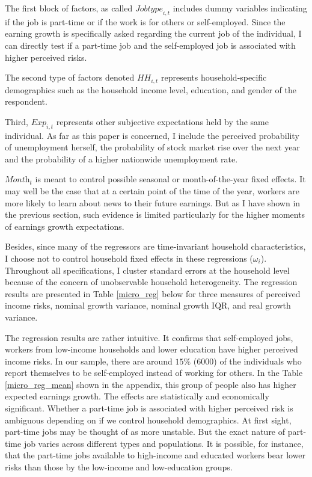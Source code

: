 \documentclass[12pt,notitlepage,onecolumn,aps,pra]{article}
\begin{document}
The first block of factors, as called \(\textit{Jobtype}_{i,t}\)
includes dummy variables indicating if the job is part-time or if the
work is for others or self-employed. Since the earning growth is
specifically asked regarding the current job of the individual, I can
directly test if a part-time job and the self-employed job is associated
with higher perceived risks.

The second type of factors denoted \(\textit{HH}_{i,t}\) represents
household-specific demographics such as the household income level,
education, and gender of the respondent.

Third, \(\textit{Exp}_{i,t}\) represents other subjective expectations
held by the same individual. As far as this paper is concerned, I
include the perceived probability of unemployment herself, the
probability of stock market rise over the next year and the probability
of a higher nationwide unemployment rate.

\(\textit{Month}_t\) is meant to control possible seasonal or
month-of-the-year fixed effects. It may well be the case that at a
certain point of the time of the year, workers are more likely to learn
about news to their future earnings. But as I have shown in the previous
section, such evidence is limited particularly for the higher moments of
earnings growth expectations.

Besides, since many of the regressors are time-invariant household
characteristics, I choose not to control household fixed effects in
these regressions (\(\omega_i\)). Throughout all specifications, I
cluster standard errors at the household level because of the concern of
unobservable household heterogeneity. The regression results are
presented in Table \ref{micro_reg} below for three measures of perceived
income risks, nominal growth variance, nominal growth IQR, and real
growth variance.

The regression results are rather intuitive. It confirms that
self-employed jobs, workers from low-income households and lower
education have higher perceived income risks. In our sample, there are
around \(15\%\) (6000) of the individuals who report themselves to be
self-employed instead of working for others. In the Table
\ref{micro_reg_mean} shown in the appendix, this group of people also
has higher expected earnings growth. The effects are statistically and
economically significant. Whether a part-time job is associated with
higher perceived risk is ambiguous depending on if we control household
demographics. At first sight, part-time jobs may be thought of as more
unstable. But the exact nature of part-time job varies across different
types and populations. It is possible, for instance, that the part-time
jobs available to high-income and educated workers bear lower risks than
those by the low-income and low-education groups.
\end{document}

